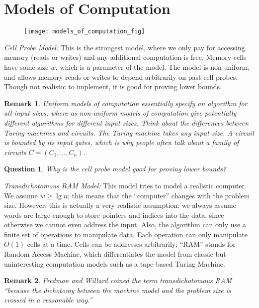 \documentclass[11pt]{article}
\newtheorem{question}{Question}
\newtheorem{remark}{Remark}
\begin{document}
\section{Models of Computation}

\begin{figure}[htbp]
\begin{center}
\texttt{[image: models\_of\_computation\_fig]}
\end{center}
\end{figure}

{\em Cell Probe Model: } This is the strongest model, where we only pay for accessing memory (reads or writes) and any additional computation is free. Memory cells have some size $w$, which is a parameter of the model. The model is non-uniform, and allows memory reads or writes to depend arbitrarily on past cell probes. Though not realistic to implement, it is good for proving
lower bounds.

\begin{remark}
Uniform models of computation essentially specify an algorithm for all input sizes, where as non-uniform models of computation give potentially different algorithms for different input sizes.  Think about the differences between Turing machines and circuits.  The Turing machine takes any input size.  A circuit is bounded by its input gates, which is why people often talk about a family of circuits $C=(C_{1}, \ldots, C_{n})$.
\end{remark}

\begin{question}
Why is the cell probe model good for proving lower bounds?
\end{question}

{\em Transdichotomous RAM Model: } This model tries to model a realistic computer. We assume $w \geq \lg{n}$; this means that the ``computer'' changes with
the problem size. However, this is actually a very realistic assumption: we always assume words are large enough to store pointers and indices into the data, since otherwise we cannot even address the input. Also, the algorithm can only use a finite set of operations to manipulate data. Each operation can only manipulate $O(1)$ cells at a time. Cells can be addresses arbitrarily; ``RAM'' stands for Random Access Machine, which differentiates the model from classic but uninteresting computation models such as a tape-based Turing Machine.

\begin{remark}
Fredman and Willard coined the term {\em transdichotomous RAM} ``because the dichotomy between the machine model and the problem size is crossed in a reasonable way.''
\end{remark}
\end{document}
